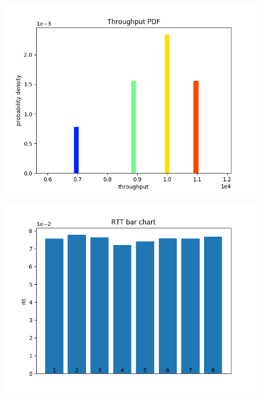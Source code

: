 \documentclass{article}
\begin{document}
\begin{figure}[h] \label{usrp-success-4}
	\includegraphics[width=\textwidth]{usrp_success_tp_pdf}	
\end{figure}

\begin{figure}[h] \label{usrp-success-5}
	\includegraphics[width=\textwidth]{usrp_success_rtt_bar}	
\end{figure}
\end{document}
